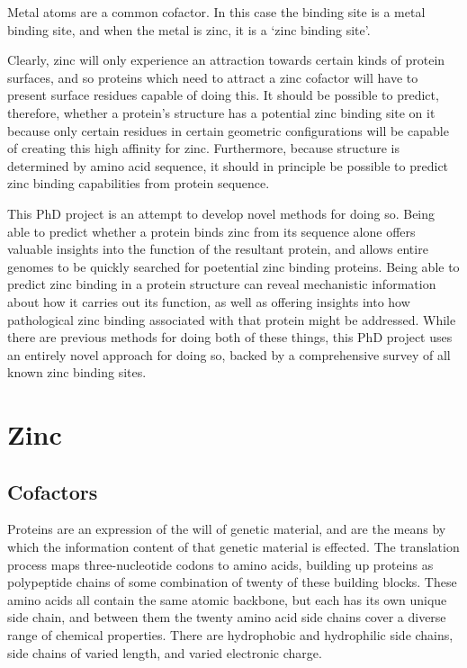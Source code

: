 Metal atoms are a common cofactor. In this case the binding site is a metal binding site, and when the metal is zinc, it is a `zinc binding site'.

Clearly, zinc will only experience an attraction towards certain kinds of protein surfaces, and so proteins which need to attract a zinc cofactor will have to present surface residues capable of doing this. It should be possible to predict, therefore, whether a protein's structure has a potential zinc binding site on it because only certain residues in certain geometric configurations will be capable of creating this high affinity for zinc. Furthermore, because structure is determined by amino acid sequence, it should in principle be possible to predict zinc binding capabilities from protein sequence.

This PhD project is an attempt to develop novel methods for doing so. Being able to predict whether a protein binds zinc from its sequence alone offers valuable insights into the function of the resultant protein, and allows entire genomes to be quickly searched for poetential zinc binding proteins. Being able to predict zinc binding in a protein structure can reveal mechanistic information about how it carries out its function, as well as offering insights into how pathological zinc binding associated with that protein might be addressed. While there are previous methods for doing both of these things, this PhD project uses an entirely novel approach for doing so, backed by a comprehensive survey of all known zinc binding sites.

\section{Zinc}

\subsection{Cofactors}

Proteins are an expression of the will of genetic material, and are the means by which the information content of that genetic material is effected. The translation process maps three-nucleotide codons to amino acids, building up proteins as polypeptide chains of some combination of twenty of these building blocks. These amino acids all contain the same atomic backbone, but each has its own unique side chain, and between them the twenty amino acid side chains cover a diverse range of chemical properties. There are hydrophobic and hydrophilic side chains, side chains of varied length, and varied electronic charge.

